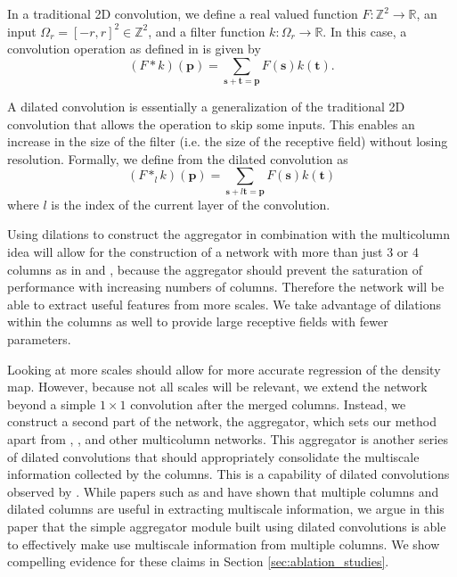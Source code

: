 \documentclass[10pt,twocolumn,letterpaper]{article}
\begin{document}
In a traditional 2D convolution, we define a real valued function \(F: \mathbb{Z}^2 \to \mathbb{R}\), an input \(\Omega_r = [-r, r]^2 \in \mathbb{Z}^2\), and a filter function \(k: \Omega_r \to \mathbb{R}\). In this case, a convolution operation as defined in \cite{yu2015} is given by
\begin{equation}
(F * k)(\mathbf{p}) = \sum_{\mathbf{s} + \mathbf{t} = \mathbf{p}} F(\mathbf{s})k(\mathbf{t}).
\end{equation}

A dilated convolution is essentially a generalization of the traditional 2D convolution that allows the operation to skip some inputs. This enables an increase in the size of the filter (i.e. the size of the receptive field) without losing resolution. Formally, we define from \cite{yu2015} the dilated convolution as 
\begin{equation}(F *_l k)(\mathbf{p}) = \sum_{\mathbf{s} + l\mathbf{t} = \mathbf{p}} F(\mathbf{s})k(\mathbf{t})
\end{equation}
where \(l\) is the index of the current layer of the convolution.

Using dilations to construct the aggregator in combination with the multicolumn idea will allow for the construction of a network with more than just 3 or 4 columns as in \cite{zhang2016single} and \cite{chen2017deeplab}, because the aggregator should prevent the saturation of performance with increasing numbers of columns. Therefore the network will be able to extract useful features from more scales. We take advantage of dilations within the columns as well to provide large receptive fields with fewer parameters.

Looking at more scales should allow for more accurate regression of the density map. However, because not all scales will be relevant, we extend the network beyond a simple \(1 \times 1\) convolution after the merged columns. Instead, we construct a second part of the network, the aggregator, which sets our method apart from \cite{zhang2016single}, \cite{chen2017deeplab}, and other multicolumn networks. This aggregator is another series of dilated convolutions that should appropriately consolidate the multiscale information collected by the columns. This is a capability of dilated convolutions observed by \cite{yu2015}. While papers such as \cite{zhang2016single} and \cite{chen2017deeplab} have shown that multiple columns and dilated columns are useful in extracting multiscale information, we argue in this paper that the simple aggregator module built using dilated convolutions is able to effectively make use multiscale information from multiple columns. We show compelling evidence for these claims in Section \ref{sec:ablation_studies}.
\end{document}
